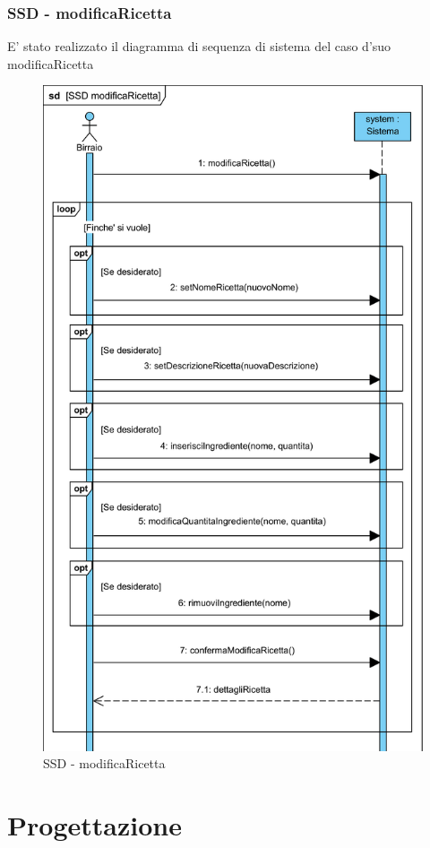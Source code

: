 \documentclass[a4paper,12pt]{report}
\begin{document}
		\subsection{SSD - modificaRicetta}
			E' stato realizzato il diagramma di sequenza di sistema del caso d'suo modificaRicetta
			\begin{figure}[!h]
				\centering
				\includegraphics[width=0.7\linewidth]{image/SSD-modificaRicetta.png}
				\caption{SSD - modificaRicetta}\label{fig:1}
			\end{figure}


      \chapter{Progettazione}
     
\end{document}
